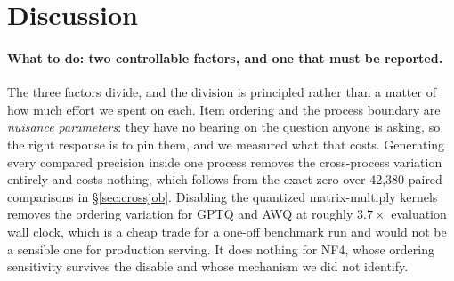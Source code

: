 \documentclass[conference]{IEEEtran}
\begin{document}
%
%
%


\section{Discussion}
\label{sec:discussion}

\paragraph{What to do: two controllable factors, and one that must be reported.}
The three factors divide, and the division is principled rather than a matter of how
much effort we spent on each. Item ordering and the process boundary are \emph{nuisance
parameters}: they have no bearing on the question anyone is asking, so the right response
is to pin them, and we measured what that costs. Generating every compared precision
inside one process removes the cross-process variation entirely and costs nothing, which
follows from the exact zero over 42{,}380 paired comparisons in
\S\ref{sec:crossjob}. Disabling the quantized matrix-multiply kernels removes the
ordering variation for GPTQ and AWQ at roughly $3.7\times$ evaluation wall clock, which is
a cheap trade for a one-off benchmark run and would not be a sensible one for production
serving. It does nothing for NF4, whose ordering sensitivity survives the disable and
whose mechanism we did not identify.
\end{document}
